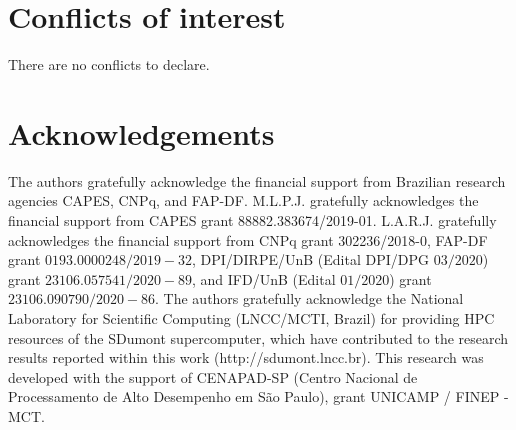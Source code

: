 \documentclass[twoside,twocolumn,9pt]{article}
\renewcommand{\refname}{Notes and references}
\begin{document}
\section*{Conflicts of interest}

There are no conflicts to declare.

\section*{Acknowledgements}
The authors gratefully acknowledge the financial support from Brazilian research agencies CAPES, CNPq, and FAP-DF. M.L.P.J. gratefully acknowledges the financial support from CAPES grant 88882.383674/2019-01. L.A.R.J. gratefully acknowledges the financial support from CNPq grant 302236/2018-0, FAP-DF grant $0193.0000248/2019-32$, DPI/DIRPE/UnB (Edital DPI/DPG $03/2020$) grant $23106.057541/2020-89$, and IFD/UnB (Edital $01/2020$) grant $23106.090790/2020-86$. The authors gratefully acknowledge the National Laboratory for Scientific Computing (LNCC/MCTI, Brazil) for providing HPC resources of the SDumont supercomputer, which have contributed to the research results reported within this work (http://sdumont.lncc.br). This research was developed with the support of CENAPAD-SP (Centro Nacional de Processamento de Alto Desempenho em S\~ao Paulo), grant UNICAMP / FINEP - MCT.



\balance


\end{document}
